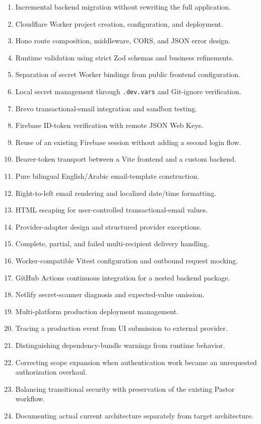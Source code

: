 \documentclass[11pt,a4paper,oneside]{report}
\begin{document}
\begin{enumerate}
  \item Incremental backend migration without rewriting the full application.
  \item Cloudflare Worker project creation, configuration, and deployment.
  \item Hono route composition, middleware, CORS, and JSON error design.
  \item Runtime validation using strict Zod schemas and business refinements.
  \item Separation of secret Worker bindings from public frontend configuration.
  \item Local secret management through \texttt{.dev.vars} and Git-ignore verification.
  \item Brevo transactional-email integration and sandbox testing.
  \item Firebase ID-token verification with remote JSON Web Keys.
  \item Reuse of an existing Firebase session without adding a second login flow.
  \item Bearer-token transport between a Vite frontend and a custom backend.
  \item Pure bilingual English/Arabic email-template construction.
  \item Right-to-left email rendering and localized date/time formatting.
  \item HTML escaping for user-controlled transactional-email values.
  \item Provider-adapter design and structured provider exceptions.
  \item Complete, partial, and failed multi-recipient delivery handling.
  \item Worker-compatible Vitest configuration and outbound request mocking.
  \item GitHub Actions continuous integration for a nested backend package.
  \item Netlify secret-scanner diagnosis and expected-value omission.
  \item Multi-platform production deployment management.
  \item Tracing a production event from UI submission to external provider.
  \item Distinguishing dependency-bundle warnings from runtime behavior.
  \item Correcting scope expansion when authentication work became an unrequested authorization overhaul.
  \item Balancing transitional security with preservation of the existing Pastor workflow.
  \item Documenting actual current architecture separately from target architecture.
\end{enumerate}
\end{document}
